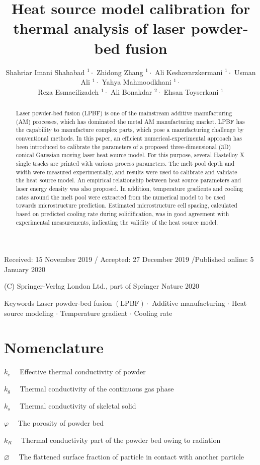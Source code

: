 \documentclass[10pt]{article}
\title{Heat source model calibration for thermal analysis of laser powder-bed fusion }
\author{Shahriar Imani Shahabad ${ }^{1} \cdot$ Zhidong Zhang $^{1} \cdot$ Ali Keshavarzkermani ${ }^{1} \cdot$ Usman Ali $^{1} \cdot$ Yahya Mahmoodkhani $^{1} \cdot$\\
Reza Esmaeilizadeh ${ }^{1} \cdot$ Ali Bonakdar $^{2} \cdot$ Ehsan Toyserkani $^{1}$}
\date{}
\begin{document}
\maketitle
Received: 15 November 2019 / Accepted: 27 December 2019 /Published online: 5 January 2020

(C) Springer-Verlag London Ltd., part of Springer Nature 2020

\begin{abstract}
Laser powder-bed fusion (LPBF) is one of the mainstream additive manufacturing (AM) processes, which has dominated the metal AM manufacturing market. LPBF has the capability to manufacture complex parts, which pose a manufacturing challenge by conventional methods. In this paper, an efficient numerical-experimental approach has been introduced to calibrate the parameters of a proposed three-dimensional (3D) conical Gaussian moving laser heat source model. For this purpose, several Hastelloy X single tracks are printed with various process parameters. The melt pool depth and width were measured experimentally, and results were used to calibrate and validate the heat source model. An empirical relationship between heat source parameters and laser energy density was also proposed. In addition, temperature gradients and cooling rates around the melt pool were extracted from the numerical model to be used towards microstructure prediction. Estimated microstructure cell spacing, calculated based on predicted cooling rate during solidification, was in good agreement with experimental measurements, indicating the validity of the heat source model.
\end{abstract}

Keywords Laser powder-bed fusion $(\mathrm{LPBF}) \cdot$ Additive manufacturing $\cdot$ Heat source modeling $\cdot$ Temperature gradient $\cdot$ Cooling rate

\section*{Nomenclature}
$k_{e} \quad$ Effective thermal conductivity of powder

$k_{g} \quad$ Thermal conductivity of the continuous gas phase

$k_{s} \quad$ Thermal conductivity of skeletal solid

$\varphi \quad$ The porosity of powder bed

$k_{R} \quad$ Thermal conductivity part of the powder bed owing to radiation

$\varnothing \quad$ The flattened surface fraction of particle in contact with another particle
\end{document}
